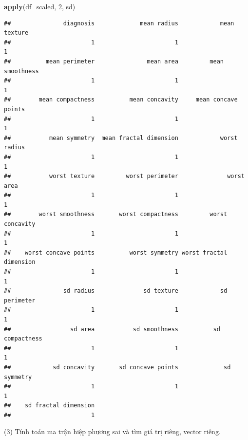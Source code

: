 \documentclass[
]{article}
\newenvironment{Shaded}{\begin{snugshade}}{\end{snugshade}}
\newcommand{\DecValTok}[1]{\textcolor[rgb]{0.00,0.00,0.81}{#1}}
\newcommand{\FunctionTok}[1]{\textcolor[rgb]{0.13,0.29,0.53}{\textbf{#1}}}
\newcommand{\NormalTok}[1]{#1}
\newcommand{\OtherTok}[1]{\textcolor[rgb]{0.56,0.35,0.01}{#1}}
\newcommand{\SpecialCharTok}[1]{\textcolor[rgb]{0.81,0.36,0.00}{\textbf{#1}}}
\begin{document}
\begin{Shaded}
\begin{Highlighting}[]
\FunctionTok{apply}\NormalTok{(df\_scaled, }\DecValTok{2}\NormalTok{, sd)}
\end{Highlighting}
\end{Shaded}

\begin{verbatim}
##               diagnosis             mean radius            mean texture 
##                       1                       1                       1 
##          mean perimeter               mean area         mean smoothness 
##                       1                       1                       1 
##        mean compactness          mean concavity     mean concave points 
##                       1                       1                       1 
##           mean symmetry  mean fractal dimension            worst radius 
##                       1                       1                       1 
##           worst texture         worst perimeter              worst area 
##                       1                       1                       1 
##        worst smoothness       worst compactness         worst concavity 
##                       1                       1                       1 
##    worst concave points          worst symmetry worst fractal dimension 
##                       1                       1                       1 
##               sd radius              sd texture            sd perimeter 
##                       1                       1                       1 
##                 sd area           sd smoothness          sd compactness 
##                       1                       1                       1 
##            sd concavity       sd concave points             sd symmetry 
##                       1                       1                       1 
##    sd fractal dimension 
##                       1
\end{verbatim}

\hfill\break
(3) Tính toán ma trận hiệp phương sai và tìm giá trị riêng, vector
riêng.

\begin{Shaded}
\end{Shaded}
\end{document}

